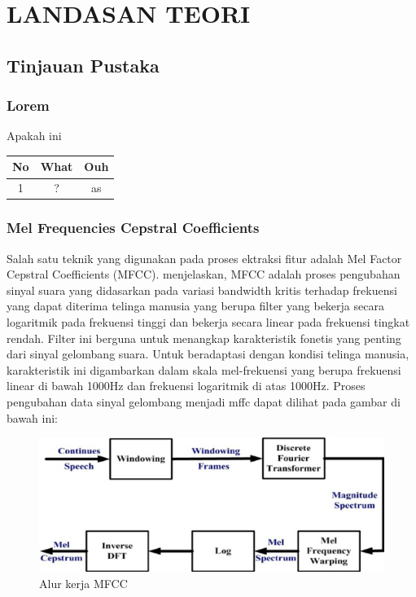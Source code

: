 \chapter{LANDASAN TEORI}

\section{Tinjauan Pustaka}
\subsection{Lorem}
\lipsum
\begin{tabel}[h]
	\caption{Apakah ini}
	\begin{tabular}{ccc}
		No & What & Ouh \\ \hline
		1 & ? & as
	\end{tabular}
\end{tabel}


%
\subsection{Mel Frequencies Cepstral Coefficients}
Salah satu teknik yang digunakan pada proses ektraksi fitur adalah Mel Factor Cepstral Coefficients (MFCC). \cite{Setiawan2011} menjelaskan, MFCC adalah proses pengubahan sinyal suara yang didasarkan pada variasi bandwidth kritis terhadap frekuensi yang dapat diterima telinga manusia yang berupa filter yang bekerja secara logaritmik pada frekuensi tinggi dan bekerja secara linear pada frekuensi tingkat rendah. Filter ini berguna untuk menangkap karakteristik fonetis yang penting dari sinyal gelombang suara. Untuk beradaptasi dengan kondisi telinga manusia, karakteristik ini digambarkan dalam skala mel-frekuensi yang berupa frekuensi linear di bawah 1000Hz dan frekuensi logaritmik di atas 1000Hz. Proses pengubahan data sinyal gelombang menjadi mffc dapat dilihat pada gambar di bawah ini:
\begin{figure}[H]
	\centering
	\includegraphics[width=0.7\linewidth]{Gambar/skema-mfcc}
	\caption{Alur kerja MFCC}
	\label{fig:skema-mfcc}
\end{figure}

